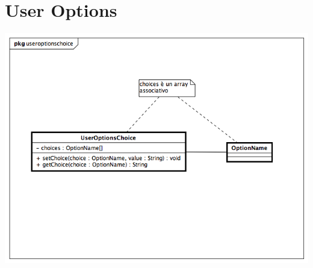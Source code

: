\documentclass[a4paper, 12pt]{report}
\begin{document}
\section{User Options}
\includegraphics[width=\textwidth]{diagramma_classe/useroptionschoice.png}
\end{document}
